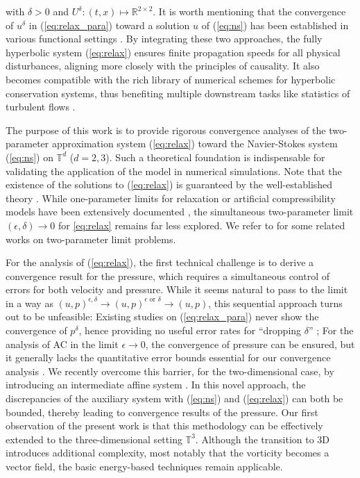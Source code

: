 \documentclass[reqno,10pt]{amsart}
\theoremstyle{definition}
\theoremstyle{remark}
\numberwithin{equation}{section}
\begin{document}
with $\delta>0$ and $U^\delta: (t,x) \mapsto \mathbb R^{2\times 2}$. 
It is worth mentioning that the convergence of $u^\delta$ in (\ref{eq:relax_para}) toward a solution $u$ of (\ref{eq:ns}) has been established in various functional settings \cite{Brenier2003,hachicha2014, ilyin2018,paicu2007,racke2012}. 
By integrating these two approaches, the fully hyperbolic system (\ref{eq:relax}) ensures finite propagation speeds for all physical disturbances, aligning more closely with the principles of causality. It also becomes compatible with the rich library of numerical schemes for hyperbolic conservation systems, thus benefiting multiple downstream tasks like statistics of turbulent flows \cite{friedrich2012,Lundgren}.

The purpose of this work is to provide rigorous convergence analyses of the two-parameter approximation system (\ref{eq:relax}) toward the Navier-Stokes system (\ref{eq:ns}) on $\mathbb T^d$ ($d=2,3$). Such a theoretical foundation is indispensable for validating the application of the model in numerical simulations. Note that the existence of the solutions to (\ref{eq:relax}) is guaranteed by the well-established theory \cite{kato1975}. While one-parameter limits for relaxation or artificial compressibility models have been extensively documented \cite{klainerman1981, temam2001ns, Yong1999}, the simultaneous two-parameter limit $(\epsilon, \delta) \to 0$ for \eqref{eq:relax} remains far less explored. We refer to \cite{brenier2005,xu2009,Yong2001} for some related works on two-parameter limit problems.

For the analysis of (\ref{eq:relax}), the first technical challenge is to derive a convergence result for the pressure, which requires a simultaneous control of errors for both velocity and pressure. While it seems natural to pass to the limit in a way as $(u, p)^{\epsilon, \delta} \to (u, p)^{\epsilon \text{ or } \delta} \to (u, p)$, this sequential approach turns out to be unfeasible: Existing studies on (\ref{eq:relax_para}) never show the convergence of $p^\delta$, hence providing no useful error rates for ``dropping $\delta$” \cite{Brenier2003,hachicha2014,paicu2007}; For the analysis of AC in the limit $\epsilon\to 0$, the convergence of pressure can be ensured, but it generally lacks the quantitative error bounds essential for our convergence analysis \cite{donatelli2010,kagei2021,temam2001ns}. We recently overcome this barrier, for the two-dimensional case, by introducing an intermediate affine system \cite{HRYZ25}. In this novel approach, the discrepancies of the auxiliary system with (\ref{eq:ns}) and (\ref{eq:relax}) can both be bounded, thereby leading to convergence results of the pressure. Our first observation of the present work is that this methodology can be effectively extended to the three-dimensional setting $\mathbb{T}^3$. Although the transition to 3D introduces additional complexity, most notably that the vorticity becomes a vector field, the basic energy-based techniques remain applicable.
\end{document}
